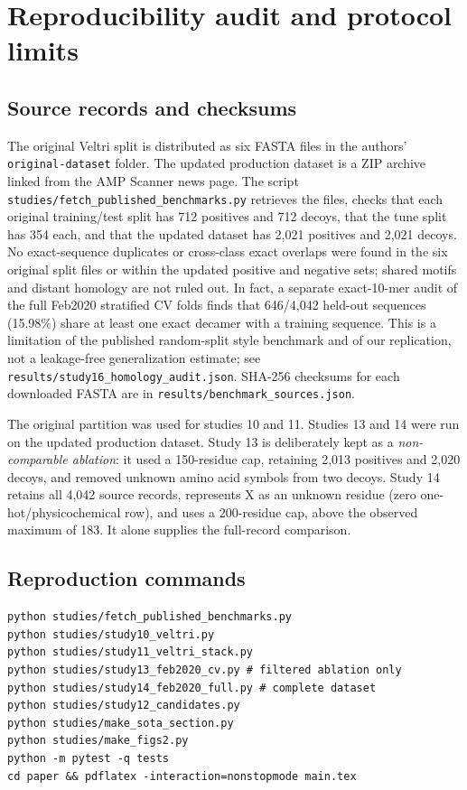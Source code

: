 \section{Reproducibility audit and protocol limits}
\label{sec:reproext}

\subsection{Source records and checksums}
The original Veltri split is distributed as six FASTA files in the authors'
\texttt{original-dataset} folder. The updated production dataset is a ZIP
archive linked from the AMP Scanner news page. The script
\texttt{studies/fetch\_published\_benchmarks.py} retrieves the files, checks
that each original training/test split has 712 positives and 712 decoys,
that the tune split has 354 each, and that the updated dataset has 2{,}021
positives and 2{,}021 decoys. No exact-sequence duplicates or cross-class exact overlaps were found in
the six original split files or within the updated positive and negative
sets; shared motifs and distant homology are not ruled out. In fact, a separate
exact-10-mer audit of the full Feb2020 stratified CV folds finds that
646/4{,}042 held-out sequences (15.98\%) share at least one exact decamer
with a training sequence. This is a limitation of the published random-split
style benchmark and of our replication, not a leakage-free generalization
estimate; see \texttt{results/study16\_homology\_audit.json}.
SHA-256 checksums for each downloaded FASTA
are in \texttt{results/benchmark\_sources.json}.

The original partition was used for studies 10 and 11. Studies 13 and 14
were run on the updated production dataset. Study 13 is deliberately kept
as a \emph{non-comparable ablation}: it used a 150-residue cap, retaining
2{,}013 positives and 2{,}020 decoys, and removed unknown amino acid symbols
from two decoys. Study 14 retains all 4{,}042 source records, represents X
as an unknown residue (zero one-hot/physicochemical row), and uses a
200-residue cap, above the observed maximum of 183. It alone supplies the
full-record comparison.

\subsection{Reproduction commands}
\begin{verbatim}
python studies/fetch_published_benchmarks.py
python studies/study10_veltri.py
python studies/study11_veltri_stack.py
python studies/study13_feb2020_cv.py # filtered ablation only
python studies/study14_feb2020_full.py # complete dataset
python studies/study12_candidates.py
python studies/make_sota_section.py
python studies/make_figs2.py
python -m pytest -q tests
cd paper && pdflatex -interaction=nonstopmode main.tex
\end{verbatim}

